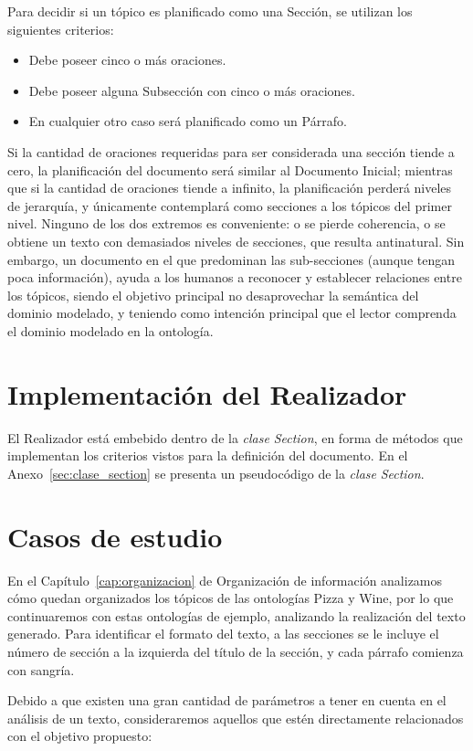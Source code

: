 Para decidir si un tópico es planificado como una Sección, se utilizan los siguientes criterios:
\begin{itemize}
    \item Debe poseer cinco o más oraciones.
    \item Debe poseer alguna Subsección con cinco o más oraciones.
    \item En cualquier otro caso será planificado como un Párrafo.
\end{itemize}

Si la cantidad de oraciones requeridas para ser considerada una sección tiende a cero, la planificación del documento será similar al Documento Inicial; mientras que si la cantidad de oraciones tiende a infinito, la planificación perderá niveles de jerarquía, y únicamente contemplará como secciones a los tópicos del primer nivel. Ninguno de los dos extremos es conveniente: o se pierde coherencia, o se obtiene un texto con demasiados niveles de secciones, que resulta antinatural. Sin embargo, un documento en el que predominan las sub-secciones (aunque tengan poca información), ayuda a los humanos a reconocer y establecer relaciones entre los tópicos, siendo el objetivo principal no desaprovechar la semántica del dominio modelado, y teniendo como intención principal que el lector comprenda el dominio modelado en la ontología.

\section{Implementación del Realizador}
El Realizador está embebido dentro de la \textit{clase }\textit{Section}, en forma de métodos que implementan los criterios vistos para la definición del documento. En el Anexo~\ref{sec:clase_section} se presenta un pseudocódigo de la\textit{ clase }\textit{Section}.

\section{Casos de estudio}
En el Capítulo~\ref{cap:organizacion} de Organización de información analizamos cómo quedan organizados los tópicos de las ontologías Pizza y Wine, por lo que continuaremos con estas ontologías de ejemplo, analizando la realización del texto generado. Para identificar el formato del texto, a las secciones se le incluye el número de sección a la izquierda del título de la sección, y cada párrafo comienza con sangría.

Debido a que existen una gran cantidad de  parámetros a tener en cuenta en el análisis de un texto, consideraremos aquellos que estén directamente relacionados con el objetivo propuesto: 

